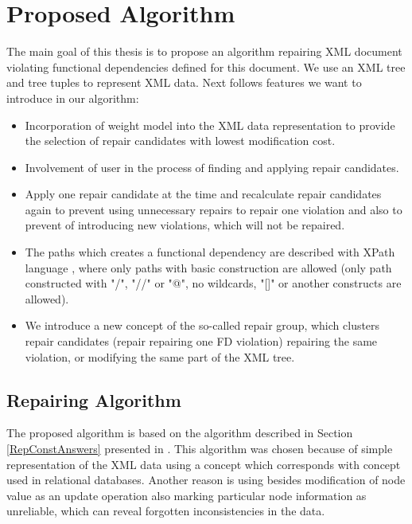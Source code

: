 \chapter{Proposed Algorithm}

The main goal of this thesis is to propose an algorithm repairing XML document violating functional dependencies defined for this document. We use an XML tree and tree tuples to represent XML data. Next follows features we want to introduce in our algorithm:

\begin{itemize}
	\item Incorporation of weight model into the XML data representation to provide the selection of repair candidates with lowest modification cost.
    \item Involvement of user in the process of finding and applying repair candidates.
    \item Apply one repair candidate at the time and recalculate repair candidates again to prevent using unnecessary repairs to repair one violation and also to prevent of introducing new violations, which will not be repaired.
    \item The paths which creates a functional dependency are described with XPath language \cite{xpath}, where only paths with basic construction are allowed (only path constructed with "/", "//" or "@", no wildcards, "[]" or another constructs are allowed).
    \item We introduce a new concept of the so-called repair group, which clusters repair candidates (repair repairing one FD violation) repairing the same violation, or modifying the same part of the XML tree.
\end{itemize}


\section{Repairing Algorithm}

The proposed algorithm is based on the algorithm described in Section \ref{RepConstAnswers} presented in \cite{RepAndConsistentAnswer}. This algorithm was chosen because of simple representation of the XML data using a concept which corresponds with concept used in relational databases. Another reason is using besides modification of node value as an update operation also marking particular node information as unreliable, which can reveal forgotten inconsistencies in the data.

